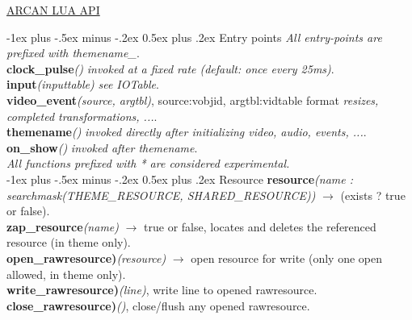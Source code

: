 \documentclass[10pt,landscape]{article}
\makeatletter
\renewcommand{\section}{\@startsection{section}{1}{0mm}%
                                {-1ex plus -.5ex minus -.2ex}%
                                {0.5ex plus .2ex}%
                                {\normalfont\large\bfseries}}
\makeatother
\begin{document}
\raggedright
\footnotesize
\begin{multicols}{3}

\setlength{\premulticols}{1pt}
\setlength{\postmulticols}{1pt}
\setlength{\multicolsep}{1pt}
\setlength{\columnsep}{2pt}

\begin{center}
     \Large{\underline{ARCAN LUA API}} \
\end{center}

\section{Entry points}
	\emph{All entry-points are prefixed with themename\_}.\\

	\textbf{clock\_pulse}\emph{()} \emph{invoked at a fixed rate (default: once every 25ms)}.\\
	\textbf{input}\emph{(inputtable)} \emph{see IOTable}.\\
	\textbf{video\_event}\emph{(source, argtbl)}, source:vobjid, argtbl:vidtable format \emph{resizes, completed transformations, ...}.\\
	\textbf{themename}\emph{()}	\emph{invoked directly after initializing video, audio, events, ...}.\\
	\textbf{on\_show}\emph{()} \emph{invoked after themename}.\\

	\emph{All functions prefixed with * are considered experimental.}\\
\section{Resource}
		\textbf{resource}\emph{(name : searchmask(THEME\_RESOURCE, SHARED\_RESOURCE))} $\rightarrow$ (exists ? true or false).\\
		\textbf{zap\_resource}\emph{(name)} $\rightarrow$ true or false, locates and deletes the referenced resource (in theme only).\\
	    \textbf{open\_rawresource)}\emph{(resource)} $\rightarrow$ open resource for write (only one open allowed, in theme only).\\
		\textbf{write\_rawresource)}\emph{(line)}, write line to opened rawresource.\\
		\textbf{close\_rawresource)}\emph{()}, close/flush any opened rawresource.\\


\end{multicols}
\end{document}
